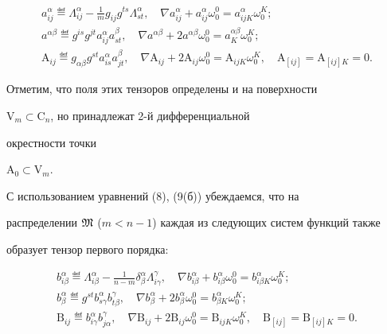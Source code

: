 \begin{gather} 


a^\alpha_{i j}\eqdef \Lambda^\alpha_{i j}-\frac{1}{m} 


g_{i j}g^{t s}\Lambda^\alpha_{s t},\quad \nabla a^\alpha_{i j}+ 


a^\alpha_{i j}\omega^0_0=a^\alpha_{i j K}\omega^K_0;\\ 


a^{\alpha\beta}\eqdef g^{is}g^{j t}a^\alpha_{i j} 


a^\beta_{s t},\quad \nabla a^{\alpha\beta}+2a^{\alpha\beta} 


\omega^0_0=a^{\alpha\beta}_K \omega^K_0;\\ 


\mathrm A_{i j}\eqdef g_{\alpha\beta}g^{s t} 


a^\alpha_{is}a^\beta_{j t},\quad \nabla\mathrm A_{i j} 


+2\mathrm A_{i j}\omega^0_0=\mathrm A_{i j K}\omega^K_0,\quad 


\mathrm A_{[i j]}=\mathrm A_{[i j]K}=0. 


\end{gather} 


Отметим, что поля этих тензоров определены и на поверхности 


$\mathrm V_m\subset\mathrm C_n$, но принадлежат 2-й дифференциальной 


окрестности точки 


$\mathrm A_0\subset\mathrm V_m$. 


 


С использованием уравнений (8), (9(б)) убеждаемся, что на 


распределении $\frak M$ ($m<n-1$) каждая из следующих систем функций также 


образует тензор первого порядка: 


\begin{gather} 


b^\alpha_{i\beta}\eqdef \Lambda^\alpha_{i\beta} 


-\frac{1}{n-m}\delta^\alpha_\beta\Lambda^\gamma_{i\gamma},\quad 


\nabla b^\alpha_{i\beta}+b^\alpha_{i\beta}\omega^0_0= 


b^\alpha_{i\beta K}\omega^K_0;\\ 


b^\alpha_\beta\eqdef g^{s t}b^\alpha_{s\gamma}b^\gamma_{t\beta},\quad 


\nabla b^\alpha_\beta+2b^\alpha_\beta\omega^0_0= 


b^\alpha_{\beta K}\omega^K_0;\\ 


\mathrm B_{i j}\eqdef b^\alpha_{i\gamma}b^\gamma_{j\alpha},\quad 


\nabla\mathrm B_{i j}+2\mathrm B_{i j}\omega^0_0= 


\mathrm B_{i j K}\omega^K_0,\quad \mathrm B_{[i j]}= 


\mathrm B_{[i j]K}=0. 


\end{gather} 


